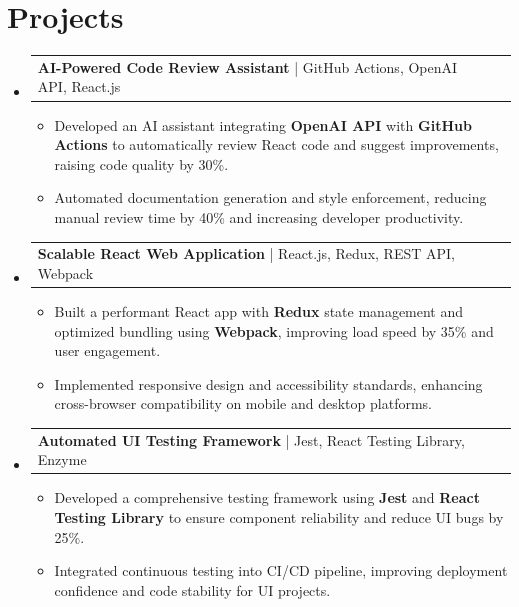 \documentclass[letterpaper,11pt]{article}
\makeatletter
\newcommand{\resumeItem}[1]{
  \item\footnotesize{
    {#1 \vspace{-2pt}}
  }
}
\newcommand{\resumeProjectHeading}[2]{
    \item
    \begin{tabular*}{1.001\textwidth}{l@{\extracolsep{\fill}}r}
      \small#1 & \textbf{\small #2}\\
    \end{tabular*}\vspace{-7pt}
}
\newcommand{\resumeSubHeadingListStart}{\begin{itemize}[leftmargin=0pt, label={}]}
\newcommand{\resumeSubHeadingListEnd}{\end{itemize}}
\newcommand{\resumeItemListStart}{\begin{itemize}[leftmargin=*]}
\newcommand{\resumeItemListEnd}{\end{itemize}\vspace{-5pt}}
\makeatother
\begin{document}
\section{Projects}
    \vspace{-5pt}
    \resumeSubHeadingListStart
      \resumeProjectHeading
          {\textbf{AI-Powered Code Review Assistant} | GitHub Actions, OpenAI API, React.js}{} 
          \resumeItemListStart
              \resumeItem{Developed an AI assistant integrating \textbf{OpenAI API} with \textbf{GitHub Actions} to automatically review React code and suggest improvements, raising code quality by 30\%.}
              \resumeItem{Automated documentation generation and style enforcement, reducing manual review time by 40\% and increasing developer productivity.}
          \resumeItemListEnd
          \vspace{-12pt}
      \resumeProjectHeading
          {\textbf{Scalable React Web Application} | React.js, Redux, REST API, Webpack}{} 
          \resumeItemListStart
              \resumeItem{Built a performant React app with \textbf{Redux} state management and optimized bundling using \textbf{Webpack}, improving load speed by 35\% and user engagement.}
              \resumeItem{Implemented responsive design and accessibility standards, enhancing cross-browser compatibility on mobile and desktop platforms.}
          \resumeItemListEnd
          \vspace{-12pt}
      \resumeProjectHeading
          {\textbf{Automated UI Testing Framework} | Jest, React Testing Library, Enzyme}{} 
          \resumeItemListStart
              \resumeItem{Developed a comprehensive testing framework using \textbf{Jest} and \textbf{React Testing Library} to ensure component reliability and reduce UI bugs by 25\%.}
              \resumeItem{Integrated continuous testing into CI/CD pipeline, improving deployment confidence and code stability for UI projects.}
          \resumeItemListEnd
    \resumeSubHeadingListEnd
\end{document}
